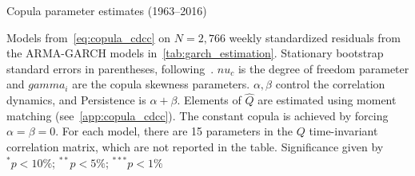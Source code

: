 
\begin{table}
  \centering
  \footnotesize
  \renewcommand{\arraystretch}{1.2}

  \caption{Copula parameter estimates (1963--2016)}

  \begin{longcaption}
    Models from~\autoref{eq:copula_cdcc} on $N = 2,766$ weekly standardized residuals from the ARMA-GARCH models in~\autoref{tab:garch_estimation}. Stationary bootstrap standard errors in parentheses, following~\autocite{PolitisRomano1994}. $nu_c$ is the degree of freedom parameter and $gamma_i$ are the copula skewness parameters. $\alpha, \beta$ control the correlation dynamics, and Persistence is $\alpha + \beta$. Elements of $\hat{Q}$ are estimated using moment matching (see~\autoref{app:copula_cdcc}). The constant copula is achieved by forcing $\alpha = \beta = 0$. For each model, there are 15 parameters in the $Q$ time-invariant correlation matrix, which are not reported in the table. Significance given by $^{*}p<10\%$; $^{**}p<5\%$; $^{***}p<1\%$
  \end{longcaption}


\end{table}
